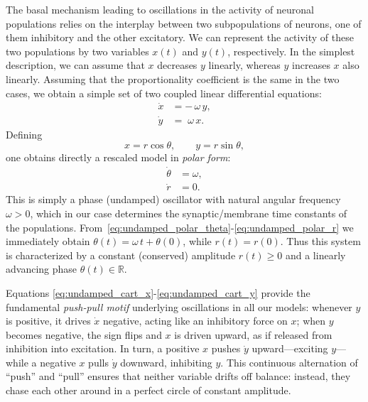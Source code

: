 \documentclass[12pt]{article}
\numberwithin{equation}{section}
\newcommand{\rev}[1]{\begingroup\color{blue}#1\endgroup}
\begin{document}
The basal mechanism leading to oscillations in the activity of neuronal populations relies on the interplay between two subpopulations of neurons, one of them inhibitory and the other excitatory.
We can represent the activity of these two populations by two variables $x(t)$ and $y(t)$, respectively.
In the simplest description, we can assume that $x$ decreases $y$ linearly, whereas $y$ increases $x$ also linearly.
Assuming that the proportionality coefficient is the same in the two cases, we obtain a simple set of two coupled linear differential equations:
\begin{align}
    \dot{x} &= -\,\omega\,y,
    \label{eq:undamped_cart_x}\\
    \dot{y} &= \;\omega\,x.
    \label{eq:undamped_cart_y}
\end{align}
Defining
\begin{equation}
    x = r \cos\theta,\qquad
    y = r \sin\theta,
    \label{eq:undamped_xy_def}
\end{equation}
one obtains directly a rescaled model in \textit{polar form}:
\begin{align}
    \dot{\theta} &= \omega, 
    \label{eq:undamped_polar_theta}\\
    \dot{r}      &= 0.
    \label{eq:undamped_polar_r}
\end{align}
This is simply a phase (undamped) oscillator with natural angular frequency $\omega>0$, which in our case determines the synaptic/membrane time constants of the populations.
From~\eqref{eq:undamped_polar_theta}-\eqref{eq:undamped_polar_r} we immediately obtain $\theta(t) = \omega\,t + \theta(0)$, while $r(t) = r(0)$. Thus this \rev{system} is characterized by a constant \rev{(conserved)} amplitude $r(t)\ge0$ and a linearly advancing phase
$\theta(t)\in\mathbb{R}$.  

  Equations \eqref{eq:undamped_cart_x}-\eqref{eq:undamped_cart_y} provide the fundamental \textit{push-pull motif} underlying oscillations in all our models: whenever \(y\) is positive, it drives \(\dot{x}\) negative, acting like an inhibitory force on \(x\); when \(y\) becomes negative, the sign flips and \(x\) is driven upward, as if released from inhibition into excitation.  In turn, a positive \(x\) pushes \(\dot{y}\) upward—exciting \(y\)—while a negative \(x\) pulls \(\dot{y}\) downward, inhibiting \(y\).  This continuous alternation of “push” and “pull” ensures that neither variable drifts off balance: instead, they chase each other around in a perfect circle of constant amplitude.
\end{document}
